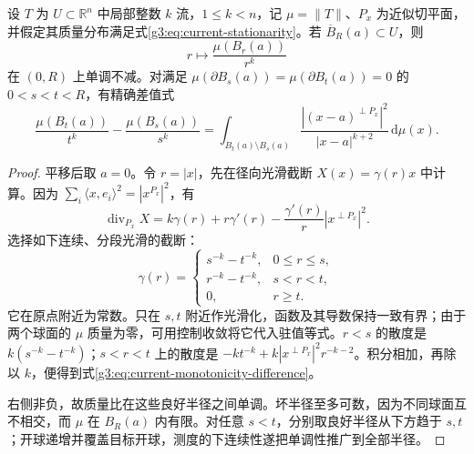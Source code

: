 \begin{theorem}\label{g3:thm:stationary-current-monotonicity}
	设 \(T\) 为 \(U\subset\mathbb R^n\) 中局部整数 \(k\) 流，\(1\le k<n\)，记 \(\mu=\|T\|\)、\(P_x\) 为近似切平面，并假定其质量分布满足式\eqref{g3:eq:current-stationarity}。若 \(\overline B_R(a)\subset U\)，则
	\[
		r\longmapsto\frac{\mu(B_r(a))}{r^k}
	\]
	在 \((0,R)\) 上单调不减。对满足
	\(\mu(\partial B_s(a))=\mu(\partial B_t(a))=0\)
	的 \(0<s<t<R\)，有精确差值式
	\begin{equation}\label{g3:eq:current-monotonicity-difference}
		\frac{\mu(B_t(a))}{t^k}-\frac{\mu(B_s(a))}{s^k}
		=\int_{B_t(a)\setminus B_s(a)}
		\frac{|(x-a)^{\perp P_x}|^2}{|x-a|^{k+2}}\,\mathrm d\mu(x).
	\end{equation}
\end{theorem}
\begin{proof}
	平移后取 \(a=0\)。令 \(r=|x|\)，先在径向光滑截断
	\(X(x)=\gamma(r)x\) 中计算。因为
	\(\sum_i\langle x,e_i\rangle^2=|x^{P_x}|^2\)，有
	\[
		\operatorname{div}_{P_x}X
		=k\gamma(r)+r\gamma'(r)
		-\frac{\gamma'(r)}r|x^{\perp P_x}|^2.
	\]
	选择如下连续、分段光滑的截断：
	\[
		\gamma(r)=
		\begin{cases}
			s^{-k}-t^{-k},&0\le r\le s,\\
			r^{-k}-t^{-k},&s<r<t,\\
			0,&r\ge t.
		\end{cases}
	\]
	它在原点附近为常数。只在 \(s,t\) 附近作光滑化，函数及其导数保持一致有界；由于两个球面的 \(\mu\) 质量为零，可用控制收敛将它代入驻值等式。\(r<s\) 的散度是 \(k(s^{-k}-t^{-k})\)；\(s<r<t\) 上的散度是
	\(-kt^{-k}+k|x^{\perp P_x}|^2r^{-k-2}\)。积分相加，再除以 \(k\)，便得到式\eqref{g3:eq:current-monotonicity-difference}。

	右侧非负，故质量比在这些良好半径之间单调。坏半径至多可数，因为不同球面互不相交，而 \(\mu\) 在 \(B_R(a)\) 内有限。对任意 \(s<t\)，分别取良好半径从下方趋于 \(s,t\)；开球递增并覆盖目标开球，测度的下连续性遂把单调性推广到全部半径。
\end{proof}


